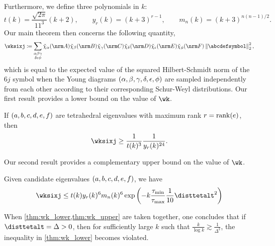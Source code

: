 \documentclass[notitlepage, 10pt]{article}
\begin{document}
Furthermore, we define three polynomials in $k$:
\begin{equation}
    t(k) = \frac{\sqrt{2\pi}}{11^3}(k+2), \qquad y_r(k) = (k+3)^{r-1}, \qquad m_n(k) = (k+3)^{n(n-1)/2}.
\end{equation}
Our main theorem then concerns the following quantity,
\begin{equation}
    \wksixj \coloneqq \sum_{\substack{\ya\yb\yc\\\yd\ye\yf}} \tilde \chi_\ya(\nrm A)\tilde \chi_\yb(\nrm B)\tilde \chi_\yc(\nrm C)\tilde \chi_\yd(\nrm D)\tilde \chi_\ye(\nrm E)\tilde \chi_\yf(\nrm F) \norm{\abcdefsymbol}_{2}^2,
\end{equation}
which is equal to the expected value of the squared Hilbert-Schmidt norm of the $6j$ symbol when the Young diagrams $(\alpha,\beta,\gamma,\delta,\epsilon,\phi)$ are sampled independently from each other according to their corresponding Schur-Weyl distributions.
Our first result provides a lower bound on the value of $\wk$.
\begin{thm}
    \label{thm:wk_lower}
    If $(a,b,c,d,e,f)$ are tetrahedral eigenvalues with maximum rank $r = \operatorname{rank}(e)$, then
    \begin{equation}
        \wksixj \geq \frac{1}{t(k)^3}\frac{1}{y_r(k)^{24}}.
    \end{equation}
\end{thm}
Our second result provides a complementary upper bound on the value of $\wk$.
\begin{thm}
    \label{thm:wk_upper}
    Given candidate eigenvalues $(a,b,c,d,e,f)$, we have
    \begin{equation}
        \wksixj \leq t(k)y_{r}(k)^6m_n(k)^6\exp\left(-k\frac{\tau_{\min}}{\tau_{\max}} \frac{1}{10}\disttetalt^2\right)
    \end{equation}
\end{thm}
When \cref{thm:wk_lower,thm:wk_upper} are taken together, one concludes that if $\disttetalt = \Delta > 0$, then for sufficiently large $k$ such that $\frac{k}{\log k} \gtrsim \frac{1}{\Delta^2}$, the inequality in \cref{thm:wk_lower} becomes violated.
\end{document}
